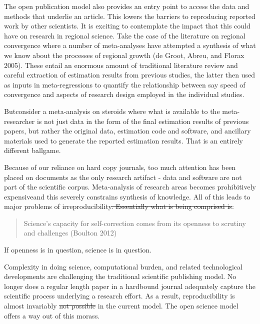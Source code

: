 \documentclass{article}
\providecommand{\DIFadd}[1]{{\protect\color{blue}\uwave{#1}}} %
\providecommand{\DIFdel}[1]{{\protect\color{red}\sout{#1}}}                      %
\providecommand{\DIFaddbegin}{} %
\providecommand{\DIFaddend}{} %
\providecommand{\DIFdelbegin}{} %
\providecommand{\DIFdelend}{} %
\begin{document}
The open publication model also provides an entry point to access the
data and methods that underlie an article. This lowers the barriers to
reproducing reported work by other scientists. It is exciting to
contemplate the impact that this could have on research in regional
science. Take the case of the literature on regional convergence where a
number of meta-analyses have attempted a synthesis of what we know about
the processes of regional growth ({de Groot}, Abreu, and Florax 2005).
These entail an enormous amount of traditional literature review and
careful extraction of estimation results from previous studies, the
latter then \DIFaddbegin \DIFadd{being }\DIFaddend used as inputs in meta-regressions to quantify the
relationship between say speed of convergence and aspects of research
design employed in the individual studies.

But\DIFaddbegin \DIFadd{, }\DIFaddend consider a meta-analysis on steroids where what is available to the
meta-researcher is not just data in the form of the final estimation
results of previous papers, but rather the original data, estimation
code and software, and ancillary materials used to generate the reported
estimation results. That is an entirely different ballgame.

Because of our reliance on hard copy journals, too much attention has
been placed on documents as the only research artifact - data and
software are not part of the scientific corpus. Meta-analysis of
research areas becomes prohibitively expensive\DIFaddbegin \DIFadd{, }\DIFaddend and this severely
constrains \DIFaddbegin \DIFadd{the }\DIFaddend synthesis of knowledge. All of this leads to major
problems of irreproducibility\DIFdelbegin \DIFdel{. Essentially what is being comprised is}\DIFdelend \DIFaddbegin \DIFadd{, since}\DIFaddend :

\begin{quote}
Science's capacity for self-correction comes from its openness to
scrutiny and challenges (Boulton 2012)
\end{quote}

If openness is in question, science is in question.

Complexity in doing science, computational burden, and related
technological developments are challenging the traditional scientific
publishing model. No longer does a regular length paper in a hardbound
journal adequately capture the scientific process underlying a research
effort. As a result, reproducibility is almost invariably \DIFdelbegin \DIFdel{not possible
}\DIFdelend \DIFaddbegin \DIFadd{impossible }\DIFaddend in
the current model. The open science model offers a way out of this
morass.
\end{document}
